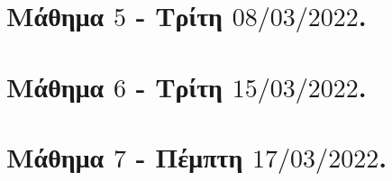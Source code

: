 \documentclass[oneside,a4paper]{article}
\begin{document}
\pagebreak


\section*{Μάθημα $5$ - Τρίτη $08/03/2022$.}
\vspace{0.3truecm}


\pagebreak


\section*{Μάθημα $6$ - Τρίτη $15/03/2022$.}
\vspace{0.3truecm}


\pagebreak


\section*{Μάθημα $7$ - Πέμπτη $17/03/2022$.}
\vspace{0.3truecm}


\pagebreak
\end{document}
